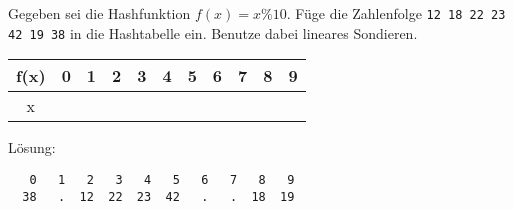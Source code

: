 
\renewcommand{\arraystretch}{2.0}
\setlength{\tabcolsep}{14pt}
\question[2]
Gegeben sei die Hashfunktion $f(x) = x \% 10$.
Füge die Zahlenfolge
\texttt{12 18 22 23 42 19 38}  in die Hashtabelle ein.
Benutze dabei lineares Sondieren.

\begin{tabular}{|c|c|c|c|c|c|c|c|c|c|c|}
\hline f(x) & 0 & 1 & 2 & 3 & 4 & 5 & 6 & 7 & 8 & 9 \\
\hline x     &   &    &    &   &   &    &    &   &   & \\
\hline
\end{tabular}

\ifprintanswers
Lösung:
\begin{lstlisting}
   0   1   2   3   4   5   6   7   8   9
  38   .  12  22  23  42   .   .  18  19
\end{lstlisting}
\fi

